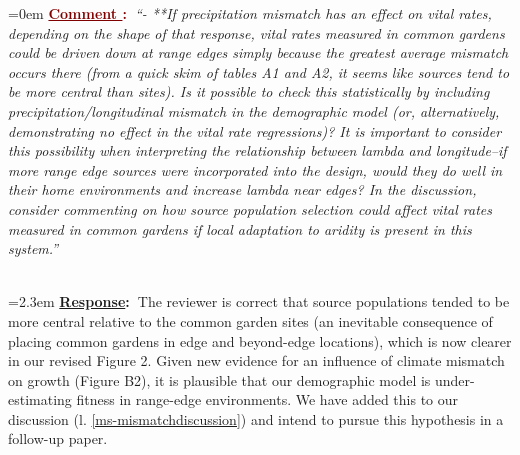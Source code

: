 \documentclass[12pt]{article}
\newcounter{cN}
\newcommand{\comment}[1]{
	\vspace{2em}
	\refstepcounter{cN} %
	\noindent \hangindent=0em \textbf{\textcolor{Maroon}{\uline{Comment \thecN}:~}}\emph{``#1''}
	}
\newcommand{\response}[1]{
	\\[0.25em]
	\hangindent=2.3em \textbf{\textcolor{NavyBlue}{\uline{Response}:~}}#1
	}
\begin{document}
\comment{- **If precipitation mismatch has an effect on vital rates, depending on the shape of that response, vital rates measured in common gardens could be driven down at range edges simply because the greatest average mismatch occurs there (from a quick skim of tables A1 and A2, it seems like sources tend to be more central than sites). Is it possible to check this statistically by including precipitation/longitudinal mismatch in the demographic model (or, alternatively, demonstrating no effect in the vital rate regressions)? It is important to consider this possibility when interpreting the relationship between lambda and longitude--if more range edge sources were incorporated into the design, would they do well in their home environments and increase lambda near edges? In the discussion, consider commenting on how source population selection could affect vital rates measured in common gardens if local adaptation to aridity is present in this system.}
\response{The reviewer is correct that source populations tended to be more central relative to the common garden sites (an inevitable consequence of placing common gardens in edge and beyond-edge locations), which is now clearer in our revised Figure 2. Given new evidence for an influence of climate mismatch on growth (Figure B2), it is plausible that our demographic model is under-estimating fitness in range-edge environments. We have added this to our discussion (l. \ref{ms-mismatchdiscussion}) and intend to pursue this hypothesis in a follow-up paper.}
\end{document}
